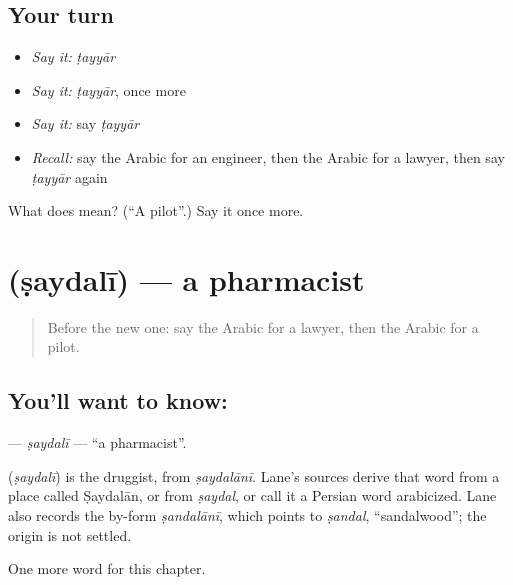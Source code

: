 \subsection*{Your turn}
\begin{itemize}
\raggedright
  \item \emph{Say it:} \emph{ṭayyār}
  \item \emph{Say it:} \emph{ṭayyār}, once more
  \item \emph{Say it:} say \emph{ṭayyār}
  \item \emph{Recall:} say the Arabic for an engineer, then the Arabic for a lawyer, then say \emph{ṭayyār} again
\end{itemize}

\begin{tcolorbox}[breakable,colback=teal!4,colframe=teal!35!black,title={Before you move on}]
What does  mean? (\textquotedblleft{}A pilot\textquotedblright{}.) Say it once more.
\end{tcolorbox}
\section[\texorpdfstring{\ar{صيدلي} (ṣaydalī)}{صيدلي (ṣaydalī)}]{ (ṣaydalī) — a pharmacist}

\label{lesson:AR-C280-saydali}



\begin{quote}
Before the new one: say the Arabic for a lawyer, then the Arabic for a pilot.
\end{quote}

\subsection*{You'll want to know: }
\textbf{} — \emph{ṣaydalī} — \textquotedblleft{}a pharmacist\textquotedblright{}.

\begin{cousinweb}
\textbf{} (\emph{ṣaydalī}) is the druggist, from \emph{ṣaydalānī}. Lane's sources derive that word from a place called Ṣaydalān, or from \emph{ṣaydal}, or call it a Persian word arabicized. Lane also records the by-form \emph{ṣandalānī}, which points to \emph{ṣandal}, \textquotedblleft{}sandalwood\textquotedblright{}; the origin is not settled.
\end{cousinweb}

\begin{grammarlens}[title={What you've built}]
One more word for this chapter.
\end{grammarlens}

